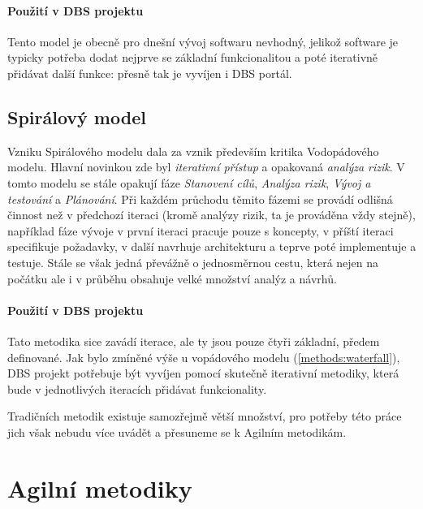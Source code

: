 \paragraph{Použití v DBS projektu}
Tento model je obecně pro dnešní vývoj softwaru nevhodný, jelikož software je typicky potřeba dodat nejprve se základní funkcionalitou a poté iterativně přidávat další funkce: přesně tak je vyvíjen i DBS portál.


\subsection{Spirálový model} \label{methods:spiral}

Vzniku Spirálového modelu dala za vznik především kritika Vodopádového modelu. Hlavní novinkou zde byl \emph{iterativní přístup} a opakovaná \emph{analýza rizik}. V tomto modelu se stále opakují fáze \emph{Stanovení cílů}, \emph{Analýza rizik}, \emph{Vývoj a testování} a \emph{Plánování}. Při každém průchodu těmito fázemi se provádí odlišná činnost než v předchozí iteraci (kromě analýzy rizik, ta je prováděna vždy stejně), například fáze vývoje v první iteraci pracuje pouze s koncepty, v příští iteraci specifikuje požadavky, v další navrhuje architekturu a teprve poté implementuje a testuje.
Stále se však jedná převážně o jednosměrnou cestu, která nejen na počátku ale i v průběhu obsahuje velké množství analýz a návrhů.

\paragraph{Použití v DBS projektu}
Tato metodika sice zavádí iterace, ale ty jsou pouze čtyři základní, předem definované. Jak bylo zmíněné výše u vopádového modelu (\ref{methods:waterfall}), DBS projekt potřebuje být vyvíjen pomocí skutečně iterativní metodiky, která bude v jednotlivých iteracích přidávat funkcionality.

Tradičních metodik existuje samozřejmě větší množství, pro potřeby této práce jich však nebudu více uvádět a přesuneme se k Agilním metodikám.


\section{Agilní metodiky} \label{methods:agile}

